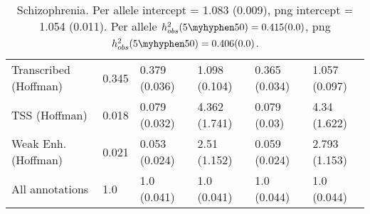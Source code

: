 \documentclass[11pt]{article}
\begin{document}
\begin{table}[H]
\begin{center}
\begin{tabular}{l|lllll}
Transcribed (Hoffman)  &  0.345 & 0.379 (0.036) & 1.098 (0.104) &
0.365 (0.034) & 1.057 (0.097) \\
TSS (Hoffman)  &  0.018 & 0.079 (0.032) & 4.362 (1.741) &
0.079 (0.03) & 4.34 (1.622) \\
Weak Enh. (Hoffman)  &  0.021 & 0.053 (0.024) & 2.51 (1.152) &
0.059 (0.024) & 2.793 (1.153) \\
All annotations  &  1.0 & 1.0 (0.041) & 1.0 (0.041) &
1.0 (0.044) & 1.0 (0.044) \\
\end{tabular}
\caption{Schizophrenia.
Per allele intercept = 1.083 (0.009),
png intercept = 1.054 (0.011).
Per allele $h^2_{obs}(5\myhyphen50) = 0.415 (0.0)$,
png $h^2_{obs}(5\myhyphen50) = 0.406 (0.0)$.}
\end{center}
\end{table}
\end{document}
